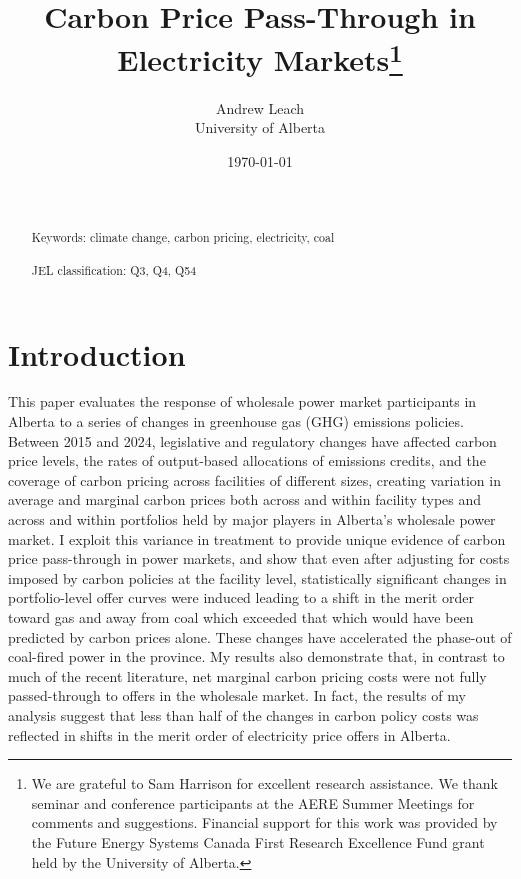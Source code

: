 \documentclass[12pt]{article}
\title{Carbon Price Pass-Through in Electricity Markets\thanks{We are grateful to Sam Harrison for excellent
research assistance. We thank seminar and conference participants at the AERE Summer Meetings for comments and suggestions. Financial support for this work was provided by the Future Energy Systems Canada First Research Excellence Fund grant held by the University of Alberta.}
}
\date{\today}
\author{Andrew Leach\\
 University of Alberta}
\begin{document}
\maketitle




\begin{abstract}
\noindent\\ \\
Keywords: climate change, carbon pricing, electricity, coal\\ \\
JEL classification: Q3, Q4, Q54
\end{abstract}

\thispagestyle{empty}
\newpage
\onehalfspacing


\section{Introduction}

This paper evaluates the response of wholesale power market participants in Alberta to a series of changes in greenhouse gas (GHG) emissions policies.  Between 2015 and 2024, legislative and regulatory changes have affected carbon price levels, the rates of output-based allocations of emissions credits, and the coverage of carbon pricing across facilities of different sizes, creating variation in average and marginal carbon prices both across and within facility types and across and within portfolios held by major players in Alberta's wholesale power market. I exploit this variance in treatment to provide unique evidence of carbon price pass-through in power markets, and show that even after adjusting for costs imposed by carbon policies at the facility level, statistically significant changes in portfolio-level offer curves were induced leading to a shift in the merit order toward gas and away from coal which exceeded that which would have been predicted by carbon prices alone. These changes have accelerated the phase-out of coal-fired power in the province. My results also demonstrate that, in contrast to much of the recent literature, net marginal carbon pricing costs were not fully passed-through to offers in the wholesale market. In fact, the results of my analysis suggest that less than half of the changes in carbon policy costs was reflected in shifts in the merit order of electricity price offers in Alberta.
\end{document}
